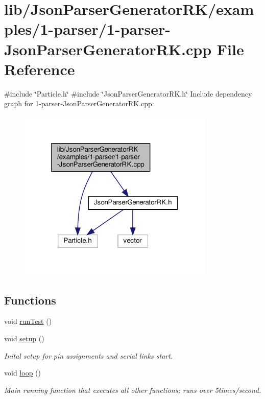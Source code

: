\hypertarget{1-parser-_json_parser_generator_r_k_8cpp}{}\section{lib/\+Json\+Parser\+Generator\+R\+K/examples/1-\/parser/1-\/parser-\/\+Json\+Parser\+Generator\+RK.cpp File Reference}
\label{1-parser-_json_parser_generator_r_k_8cpp}
{\ttfamily \#include \char`\"{}Particle.\+h\char`\"{}}\newline
{\ttfamily \#include \char`\"{}Json\+Parser\+Generator\+R\+K.\+h\char`\"{}}\newline
Include dependency graph for 1-\/parser-\/\+Json\+Parser\+Generator\+RK.cpp\+:
\nopagebreak
\begin{figure}[H]
\begin{center}
\leavevmode
\includegraphics[width=265pt]{1-parser-_json_parser_generator_r_k_8cpp__incl}
\end{center}
\end{figure}
\subsection*{Functions}
\begin{DoxyCompactItemize}
\item 
void \hyperlink{1-parser-_json_parser_generator_r_k_8cpp_a822f652c6fc2f163c182a6e5fe922c23}{run\+Test} ()
\item 
void \hyperlink{1-parser-_json_parser_generator_r_k_8cpp_a4fc01d736fe50cf5b977f755b675f11d}{setup} ()
\begin{DoxyCompactList}\small\item\em Inital setup for pin assignments and serial links start. \end{DoxyCompactList}\item 
void \hyperlink{1-parser-_json_parser_generator_r_k_8cpp_afe461d27b9c48d5921c00d521181f12f}{loop} ()
\begin{DoxyCompactList}\small\item\em Main running function that executes all other functions; runs over 5times/second. \end{DoxyCompactList}\end{DoxyCompactItemize}
